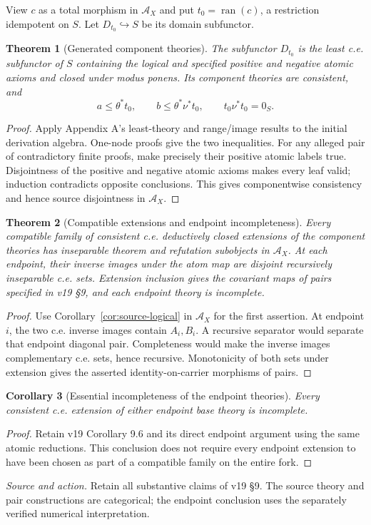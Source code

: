 \documentclass[11pt]{article}
\newtheorem{theorem}{Theorem}[section]
\newtheorem{corollary}[theorem]{Corollary}
\theoremstyle{definition}\newtheorem{definition}[theorem]{Definition}
\newcommand{\ran}{\operatorname{ran}}
\newcommand{\A}{\mathcal A}
\newcommand{\source}[1]{\par\smallskip\noindent\textit{Source and action.} #1\par\smallskip}
\begin{document}
View $c$ as a total morphism in $\A_X$ and put $t_0=\ran(c)$,
a restriction idempotent on $S$. Let $D_{t_0}\hookrightarrow S$
be its domain subfunctor.

\begin{theorem}[Generated component theories]\label{thm:fork-generated}
The subfunctor $D_{t_0}$ is the least c.e. subfunctor of $S$
containing the logical and specified positive and negative atomic
axioms and closed under modus ponens. Its component theories are
consistent, and
\[
 a\le\theta^*t_0,\qquad b\le\theta^*\nu^*t_0,
 \qquad t_0\nu^*t_0=0_S.
\]
\end{theorem}
\begin{proof}
Apply Appendix A's least-theory and range/image results to the
initial derivation algebra. One-node proofs give the two
inequalities. For any alleged pair of contradictory finite proofs,
make precisely their positive atomic labels true. Disjointness of
the positive and negative atomic axioms makes every leaf valid;
induction contradicts opposite conclusions. This gives componentwise
consistency and hence source disjointness in $\A_X$.
\end{proof}

\begin{theorem}[Compatible extensions and endpoint incompleteness]\label{thm:fork-extensions}
Every compatible family of consistent c.e. deductively closed
extensions of the component theories has inseparable theorem and
refutation subobjects in $\A_X$. At each endpoint, their inverse
images under the atom map are disjoint recursively inseparable c.e.
sets. Extension inclusion gives the covariant maps of pairs
specified in v19 \S9, and each endpoint theory is incomplete.
\end{theorem}
\begin{proof}
Use Corollary~\ref{cor:source-logical} in $\A_X$ for the first
assertion. At endpoint $i$, the two c.e. inverse images contain
$A_i,B_i$. A recursive separator would separate that endpoint
diagonal pair. Completeness would make the inverse images
complementary c.e. sets, hence recursive. Monotonicity of both
sets under extension gives the asserted identity-on-carrier
morphisms of pairs.
\end{proof}

\begin{corollary}[Essential incompleteness of the endpoint theories]\label{cor:fork-essential}
Every consistent c.e. extension of either endpoint base theory is
incomplete.
\end{corollary}
\begin{proof}
Retain v19 Corollary 9.6 and its direct endpoint argument using
the same atomic reductions. This conclusion does not require every
endpoint extension to have been chosen as part of a compatible
family on the entire fork.
\end{proof}
\source{Retain all substantive claims of v19 \S9. The source theory and pair constructions are categorical; the endpoint conclusion uses the separately verified numerical interpretation.}
\end{document}

